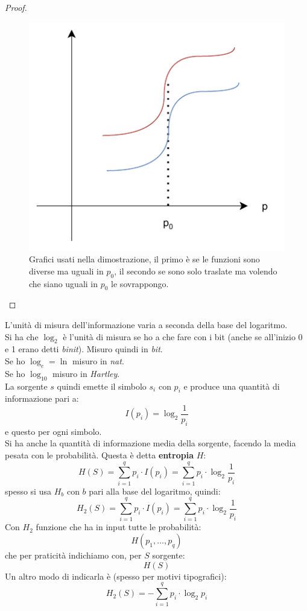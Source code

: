 \documentclass[a4paper,12pt, oneside]{book}
\begin{document}
\begin{proof}
\begin{figure}[H]
    \includegraphics[scale = 0.6]{img/grap3.pdf}
    \caption{Grafici usati nella dimostrazione, il primo è se le funzioni sono
      diverse ma uguali in $p_0$, il secondo se sono solo traslate ma volendo
      che siano uguali in $p_0$ le sovrappongo.}
    \label{fig:gr}
  \end{figure}
\end{proof}
L'unità di misura dell'informazione varia a seconda della base del logaritmo.\\
Si ha che $\log_2$ è l'unità di misura se ho a che fare con i bit (anche se
all'inizio 0 e 1 erano detti \textit{binit}). Misuro quindi in \textit{bit}. \\
Se ho $\log_e=\ln$ misuro in \textit{nat}.\\
Se ho $\log_{10}$ misuro in \textit{Hartley}.\\
La sorgente $s$ quindi emette il simbolo $s_i$ con $p_i$ e produce una quantità
di informazione pari a:
\[I(p_i)=\log_2\frac{1}{p_i}\]
e questo per ogni simbolo.\\
Si ha anche la quantità di informazione media della sorgente, facendo la media
pesata con le probabilità. Questa è detta \textbf{entropia} $H$:
\[H(S)=\sum_{i=1}^qp_i\cdot I(p_i)=\sum_{i=1}^qp_i\cdot \log_2\frac{1}{p_i}\]
spesso si usa $H_b$ con $b$ pari alla base del logaritmo, quindi:
\[H_2(S)=\sum_{i=1}^qp_i\cdot I(p_i)=\sum_{i=1}^qp_i\cdot \log_2\frac{1}{p_i}\]
Con $H_2$ funzione che ha in input tutte le probabilità:
\[H(p_1,\ldots,p_q)\]
che per praticità indichiamo con, per $S$ sorgente:
\[H(S)\]
Un altro modo di indicarla è (spesso per motivi tipografici):
\[H_2(S)=-\sum_{i=1}^qp_i\cdot \log_2{p_i}\]
\end{document}
